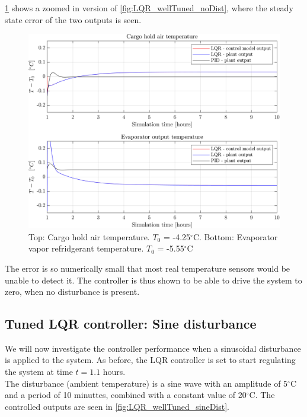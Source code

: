 \cref{fig:LQR_wellTuned_noDist_zoom} shows a zoomed in version of \cref{fig:LQR_wellTuned_noDist}, where the steady state error of the two outputs is seen.\\


\begin{figure}[h!]
	\centering
	\includegraphics[width=1\textwidth]{Graphics/fig_LQRvsKresten_noDist_zoom.png}
	\caption{Top: Cargo hold air temperature. $T_0$ = -4.25$^{\circ}$C. Bottom: Evaporator vapor refridgerant temperature. $T_0$ = -5.55$^{\circ}$C}
	\label{fig:LQR_wellTuned_noDist_zoom}
\end{figure}

The error is so numerically small that most real temperature sensors would be unable to detect it. The controller is thus shown to be able to drive the system to zero, when no disturbance is present.



\newpage
\subsection{Tuned LQR controller: Sine disturbance}
We will now investigate the controller performance when a sinusoidal disturbance is applied to the system. As before, the LQR controller is set to start regulating the system at time $t=1.1$ hours. \\


The disturbance (ambient temperature) is a sine wave with an amplitude of 5$^{\circ}$C and a period of 10 minuttes, combined with a constant value of 20$^{\circ}$C. The controlled outputs are seen in \cref{fig:LQR_wellTuned_sineDist}.\\


